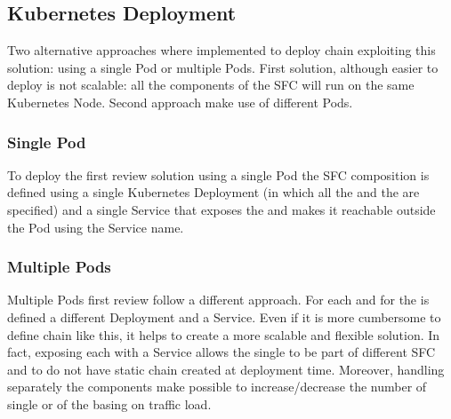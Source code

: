 \subsection{Kubernetes Deployment}
Two alternative approaches where implemented to deploy chain exploiting this
solution: using a single Pod or multiple Pods. First solution, although easier
to deploy is not scalable: all the components of the SFC will run on the same
Kubernetes Node. Second approach make use of different Pods.

\subsubsection*{Single Pod}
To deploy the first review solution using a single Pod the SFC composition is
defined using a single Kubernetes Deployment (in which all the \vnf{} and
the \enchainer{} are specified) and a single Service that exposes the
\enchainer{} and makes it reachable outside the Pod using the Service name.

\subsubsection*{Multiple Pods}
Multiple Pods first review follow a different approach. For each \vnf{}
and for the \enchainer{} is defined a different Deployment and a Service.
Even if it is more cumbersome to define chain like this, it helps to create a
more scalable and flexible solution. In fact, exposing each \vnf{} with a
Service allows the single \vnf{} to be part of different SFC and to do not
have static chain created at deployment time. Moreover, handling separately
the components make possible to increase/decrease the number of single
\vnfs{} or of the \enchainer{} basing on traffic load.

